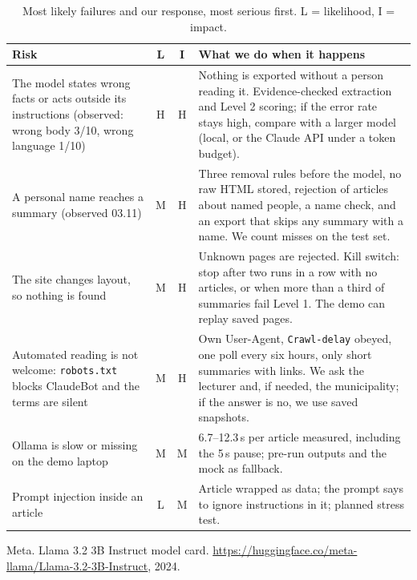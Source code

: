 \documentclass{article}
\begin{document}
\begin{table}[!ht]
  \caption{Most likely failures and our response, most serious first. L = likelihood, I = impact.}
  \label{tab:risk}
  \centering\footnotesize
  \setlength{\tabcolsep}{4pt}
  \begin{tabular}{@{}L{3.7cm}ccL{8.8cm}@{}}
    \toprule
    Risk & L & I & What we do when it happens \\
    \midrule
    The model states wrong facts or acts outside its instructions (observed: wrong body 3/10, wrong language 1/10) & H & H & Nothing is exported without a person reading it. Evidence-checked extraction and Level 2 scoring; if the error rate stays high, compare with a larger model (local, or the Claude API under a token budget). \\
    A personal name reaches a summary (observed 03.11) & M & H & Three removal rules before the model, no raw HTML stored, rejection of articles about named people, a name check, and an export that skips any summary with a name. We count misses on the test set. \\
    The site changes layout, so nothing is found & M & H & Unknown pages are rejected. Kill switch: stop after two runs in a row with no articles, or when more than a third of summaries fail Level 1. The demo can replay saved pages. \\
    Automated reading is not welcome: \texttt{robots.txt} blocks ClaudeBot and the terms are silent & M & H & Own User-Agent, \texttt{Crawl-delay} obeyed, one poll every six hours, only short summaries with links. We ask the lecturer and, if needed, the municipality; if the answer is no, we use saved snapshots. \\
    Ollama is slow or missing on the demo laptop & M & M & 6.7--12.3\,s per article measured, including the 5\,s pause; pre-run outputs and the mock as fallback. \\
    Prompt injection inside an article & L & M & Article wrapped as data; the prompt says to ignore instructions in it; planned stress test. \\
    \bottomrule
  \end{tabular}
\end{table}

\begin{thebibliography}{9}\small
{} Meta. Llama 3.2 3B Instruct model card. \url{https://huggingface.co/meta-llama/Llama-3.2-3B-Instruct}, 2024.
\end{thebibliography}
\end{document}
